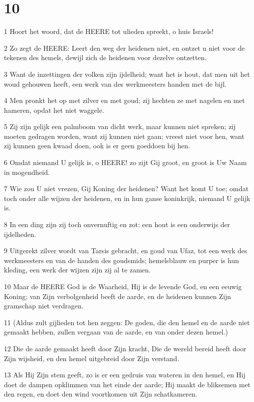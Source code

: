 \chapter{10}

\par 1 Hoort het woord, dat de HEERE tot ulieden spreekt, o huis Israels!
\par 2 Zo zegt de HEERE: Leert den weg der heidenen niet, en ontzet u niet voor de tekenen des hemels, dewijl zich de heidenen voor dezelve ontzetten.
\par 3 Want de inzettingen der volken zijn ijdelheid; want het is hout, dat men uit het woud gehouwen heeft, een werk van des werkmeesters handen met de bijl.
\par 4 Men pronkt het op met zilver en met goud; zij hechten ze met nagelen en met hameren, opdat het niet waggele.
\par 5 Zij zijn gelijk een palmboom van dicht werk, maar kunnen niet spreken; zij moeten gedragen worden, want zij kunnen niet gaan; vreest niet voor hen, want zij kunnen geen kwaad doen, ook is er geen goeddoen bij hen.
\par 6 Omdat niemand U gelijk is, o HEERE! zo zijt Gij groot, en groot is Uw Naam in mogendheid.
\par 7 Wie zou U niet vrezen, Gij Koning der heidenen? Want het komt U toe; omdat toch onder alle wijzen der heidenen, en in hun ganse koninkrijk, niemand U gelijk is.
\par 8 In een ding zijn zij toch onvernuftig en zot: een hout is een onderwijs der ijdelheden.
\par 9 Uitgerekt zilver wordt van Tarsis gebracht, en goud van Ufaz, tot een werk des werkmeesters en van de handen des goudsmids; hemelsblauw en purper is hun kleding, een werk der wijzen zijn zij al te zamen.
\par 10 Maar de HEERE God is de Waarheid, Hij is de levende God, en een eeuwig Koning; van Zijn verbolgenheid beeft de aarde, en de heidenen kunnen Zijn gramschap niet verdragen.
\par 11 (Aldus zult gijlieden tot hen zeggen: De goden, die den hemel en de aarde niet gemaakt hebben, zullen vergaan van de aarde, en van onder dezen hemel.)
\par 12 Die de aarde gemaakt heeft door Zijn kracht, Die de wereld bereid heeft door Zijn wijsheid, en den hemel uitgebreid door Zijn verstand.
\par 13 Als Hij Zijn stem geeft, zo is er een gedruis van wateren in den hemel, en Hij doet de dampen opklimmen van het einde der aarde; Hij maakt de bliksemen met den regen, en doet den wind voortkomen uit Zijn schatkameren.
